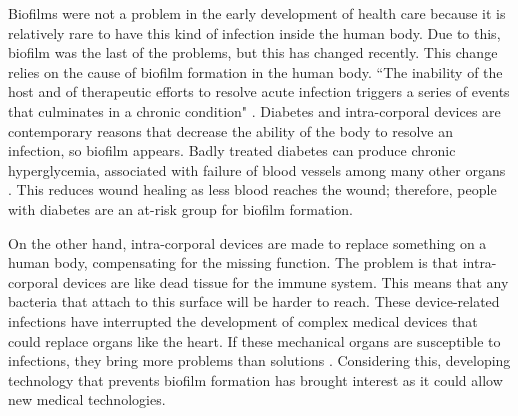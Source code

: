
Biofilms were not a problem in the early development of health care because it is relatively rare to have this kind of infection inside the human body. Due to this, biofilm was the last of the problems, but this has changed recently. This change relies on the cause of biofilm formation in the human body. ``The inability of the host and of therapeutic efforts to resolve acute infection triggers a series of events that culminates in a chronic condition" \cite{CiernyIII2006TreatmentInfection}. Diabetes and intra-corporal devices are contemporary reasons that decrease the ability of the body to resolve an infection, so biofilm appears. Badly treated diabetes can produce chronic hyperglycemia, associated with failure of blood vessels among many other organs \cite{2014DiagnosisMellitus}. This reduces wound healing as less blood reaches the wound; therefore, people with diabetes are an at-risk group for biofilm formation.

On the other hand, intra-corporal devices are made to replace something on a human body, compensating for the missing function. The problem is that intra-corporal devices are like dead tissue for the immune system. This means that any bacteria that attach to this surface will be harder to reach. These device-related infections have interrupted the development of complex medical devices that could replace organs like the heart. If these mechanical organs are susceptible to infections, they bring more problems than solutions \cite{Costerton1999IntroductionBiofilm}. Considering this, developing technology that prevents biofilm formation has brought interest as it could allow new medical technologies.

